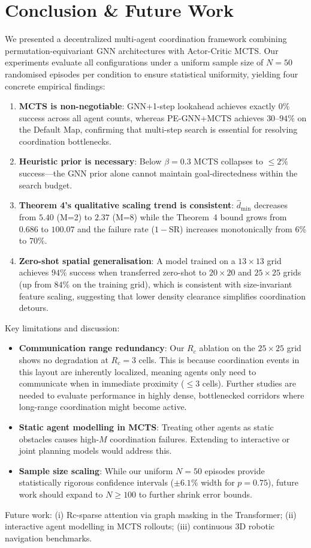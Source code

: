 \documentclass[11pt,a4paper]{article}
\begin{document}
\section{Conclusion \& Future Work}
We presented a decentralized multi-agent coordination framework combining permutation-equivariant GNN architectures with Actor-Critic MCTS. Our experiments evaluate all configurations under a uniform sample size of $N=50$ randomised episodes per condition to ensure statistical uniformity, yielding four concrete empirical findings:
\begin{enumerate}
    \item \textbf{MCTS is non-negotiable}: GNN+1-step lookahead achieves exactly $0\%$ success across all agent counts, whereas PE-GNN+MCTS achieves $30$--$94\%$ on the Default Map, confirming that multi-step search is essential for resolving coordination bottlenecks.
    \item \textbf{Heuristic prior is necessary}: Below $\beta=0.3$ MCTS collapses to $\le 2\%$ success---the GNN prior alone cannot maintain goal-directedness within the search budget.
    \item \textbf{Theorem 4's qualitative scaling trend is consistent}: $\hat{d}_{\min}$ decreases from $5.40$ (M=2) to $2.37$ (M=8) while the Theorem~4 bound grows from $0.686$ to $100.07$ and the failure rate ($1-$SR) increases monotonically from $6\%$ to $70\%$.
    \item \textbf{Zero-shot spatial generalisation}: A model trained on a $13{\times}13$ grid achieves $94\%$ success when transferred zero-shot to $20{\times}20$ and $25{\times}25$ grids (up from $84\%$ on the training grid), which is consistent with size-invariant feature scaling, suggesting that lower density clearance simplifies coordination detours.
\end{enumerate}
Key limitations and discussion:
\begin{itemize}
    \item \textbf{Communication range redundancy}: Our $R_c$ ablation on the $25{\times}25$ grid shows no degradation at $R_c = 3$ cells. This is because coordination events in this layout are inherently localized, meaning agents only need to communicate when in immediate proximity ($\le 3$ cells). Further studies are needed to evaluate performance in highly dense, bottlenecked corridors where long-range coordination might become active.
    \item \textbf{Static agent modelling in MCTS}: Treating other agents as static obstacles causes high-$M$ coordination failures. Extending to interactive or joint planning models would address this.
    \item \textbf{Sample size scaling}: While our uniform $N=50$ episodes provide statistically rigorous confidence intervals ($\pm 6.1\%$ width for $p=0.75$), future work should expand to $N \ge 100$ to further shrink error bounds.
\end{itemize}
Future work: (i) Rc-sparse attention via graph masking in the Transformer; (ii) interactive agent modelling in MCTS rollouts; (iii) continuous 3D robotic navigation benchmarks.
\end{document}
